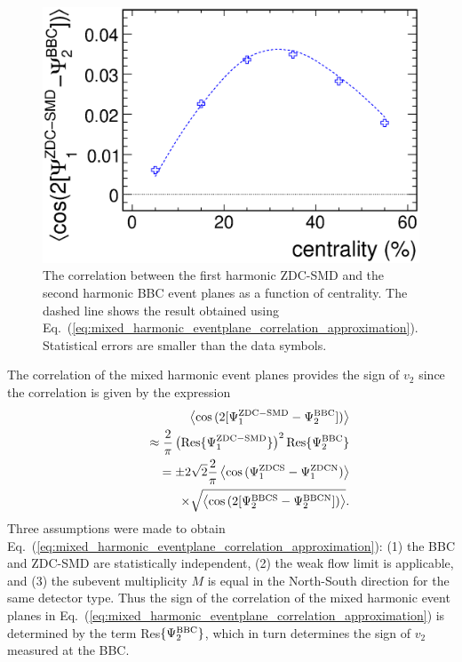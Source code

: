 \documentclass[aps,prc,superscriptaddress,showpacs,floatfix,twocolumn]{revtex4}
\begin{document}
\begin{figure}[thb]
\includegraphics[width=1.0\linewidth]{correlation_zdc-smd_bbc_2ndorder.eps}
\caption{\label{fig:correlation_zdc-smd_bbc_2ndorder}
The correlation between the first harmonic ZDC-SMD and the second harmonic BBC 
event planes as a function of centrality. The dashed line shows the result obtained using 
Eq.~(\ref{eq:mixed_harmonic_eventplane_correlation_approximation}).
Statistical errors are smaller than the data symbols.
}
\end{figure}
The correlation of the mixed harmonic event planes provides the sign of $v_2$  
since the correlation is given by the expression~\cite{Poskanzer:1998yz}
\begin{eqnarray}
& & \left< \cos{(2[\Psi_1^{\rm ZDC-SMD}-\Psi_2^{\rm BBC}])} \right> \nonumber \\
& & \qquad \approx \frac{2}{\pi} \left(\text{Res}\{\Psi_1^{\rm ZDC-SMD}\}\right)^2
          \text{Res}\{\Psi_2^{\rm BBC}\} \nonumber \\
& & \qquad = \pm 2\sqrt{2} \frac{2}{\pi} 
  \left< \cos{(\Psi_1^{\rm ZDCS}-\Psi_{1}^{\rm ZDCN})} \right> \nonumber \\
& & \qquad ~~ \times \sqrt{\left< \cos{(2[\Psi_2^{\rm BBCS}-\Psi_{2}^{\rm BBCN}])} \right>}.
\label{eq:mixed_harmonic_eventplane_correlation_approximation}
\end{eqnarray}
Three assumptions were made to obtain 
Eq.~(\ref{eq:mixed_harmonic_eventplane_correlation_approximation}):
(1) the BBC and ZDC-SMD are statistically independent, 
(2) the weak flow limit is applicable, and
(3) the subevent multiplicity $M$ is equal in the North-South direction for the same detector type.
Thus the sign of the correlation of the mixed harmonic event planes in 
Eq.~(\ref{eq:mixed_harmonic_eventplane_correlation_approximation}) is determined by the term 
Res$\{\Psi_2^{\rm BBC}\}$, which in turn determines the sign of $v_2$ measured at the BBC.
\end{document}
